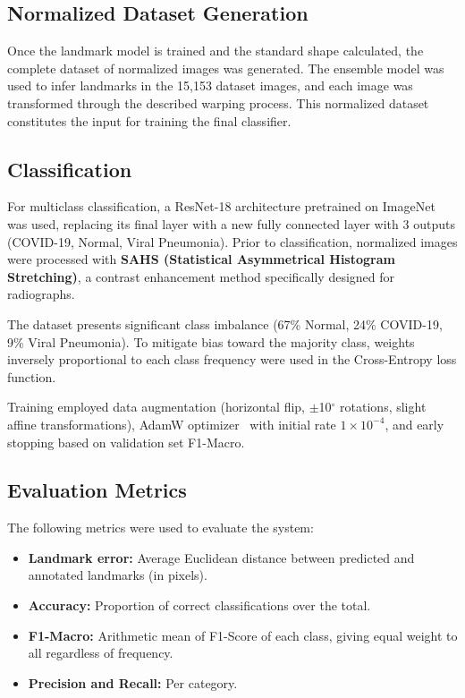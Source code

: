 \documentclass[applsci,article,submit,pdftex,moreauthors]{Definitions/mdpi}
\begin{document}
\subsection{Normalized Dataset Generation}

Once the landmark model is trained and the standard shape calculated, the complete dataset of normalized images was generated. The ensemble model was used to infer landmarks in the 15,153 dataset images, and each image was transformed through the described warping process. This normalized dataset constitutes the input for training the final classifier.

\subsection{Classification}

For multiclass classification, a ResNet-18 architecture pretrained on ImageNet was used, replacing its final layer with a new fully connected layer with 3 outputs (COVID-19, Normal, Viral Pneumonia). Prior to classification, normalized images were processed with \textbf{SAHS (Statistical Asymmetrical Histogram Stretching)}, a contrast enhancement method specifically designed for radiographs.

The dataset presents significant class imbalance (67\% Normal, 24\% COVID-19, 9\% Viral Pneumonia). To mitigate bias toward the majority class, weights inversely proportional to each class frequency were used in the Cross-Entropy loss function.

Training employed data augmentation (horizontal flip, $\pm$10$^{\circ}$ rotations, slight affine transformations), AdamW optimizer~\cite{loshchilov2019adamw} with initial rate $1 \times 10^{-4}$, and early stopping based on validation set F1-Macro.

\subsection{Evaluation Metrics}

The following metrics were used to evaluate the system:

\begin{itemize}
\item \textbf{Landmark error:} Average Euclidean distance between predicted and annotated landmarks (in pixels).
\item \textbf{Accuracy:} Proportion of correct classifications over the total.
\item \textbf{F1-Macro:} Arithmetic mean of F1-Score of each class, giving equal weight to all regardless of frequency.
\item \textbf{Precision and Recall:} Per category.
\end{itemize}
\end{document}
